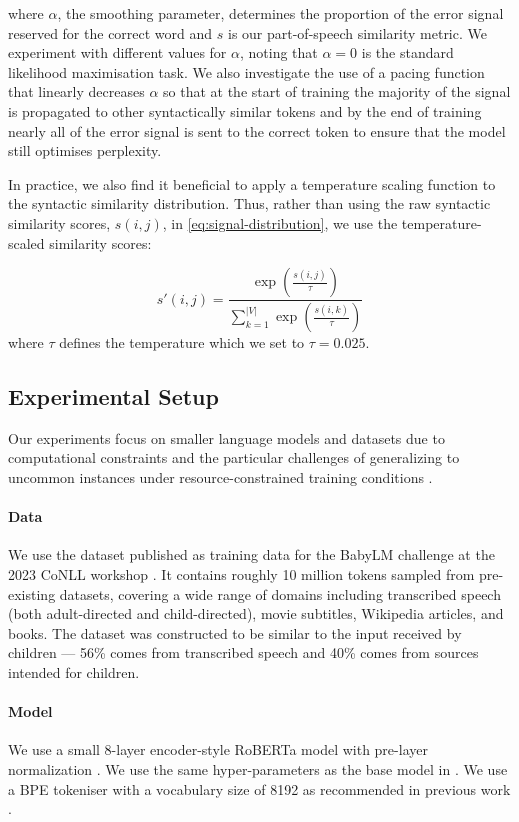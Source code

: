 \noindent
where $\alpha$, the smoothing parameter, determines the proportion of the error signal reserved for the correct word and $s$ is our part-of-speech similarity metric. We experiment with different values for $\alpha$, noting that $\alpha=0$ is the standard likelihood maximisation task. We also investigate the use of a pacing function that linearly decreases $\alpha$ so that at the start of training the majority of the signal is propagated to other syntactically similar tokens and by the end of training nearly all of the error signal is sent to the correct token to ensure that the model still optimises perplexity. 

In practice, we also find it beneficial to apply a temperature scaling function to the syntactic similarity distribution. Thus, rather than using the raw syntactic similarity scores, $s(i,j)$, in \cref{eq:signal-distribution}, we use the temperature-scaled similarity scores:

$$
s'(i,j) = \frac{\exp\left(\frac{s(i,j)}{\tau}\right)}{\sum_{k=1}^{|V|} \exp\left(\frac{s(i,k)}{\tau}\right)}
$$
where $\tau$ defines the temperature which we set to $\tau=0.025$.

\subsection{Experimental Setup}
\label{subsection:experimental_setup}

Our experiments focus on smaller language models and datasets due to computational constraints and the particular challenges of generalizing to uncommon instances under resource-constrained training conditions \citep{warstadt2023babylm1,diehlmartinez2023climb}. 

\paragraph{Data} \label{paragraph:data} We use the dataset published as training data for the BabyLM challenge at the 2023 CoNLL workshop \citep{warstadt2023babylm1}. It contains roughly 10 million tokens sampled from pre-existing datasets, covering a wide range of domains including transcribed speech (both adult-directed and child-directed), movie subtitles, Wikipedia articles, and books. The dataset was constructed to be similar to the input received by children --- 56\% comes from transcribed speech and 40\% comes from sources intended for children.

\paragraph{Model} We use a small 8-layer encoder-style RoBERTa model with pre-layer normalization \cite{huebner2021babyberta}. We use the same hyper-parameters as the base model in \cite{diehlmartinez2023climb}. We use a BPE tokeniser \citep{sennrich2016bpe} with a vocabulary size of 8192 as recommended in previous work \cite{diehlmartinez2023climb}. 

